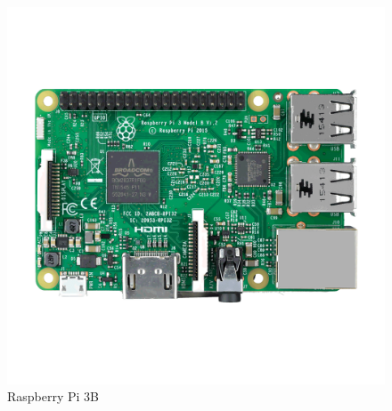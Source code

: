 \paragraph{}
\begin{figure}[H]
	\centering
	\includegraphics[scale=.23]{Capitulo2/images/raspberry.png}
	\caption{Raspberry Pi 3B}
	\label{fig:}
\end{figure}

